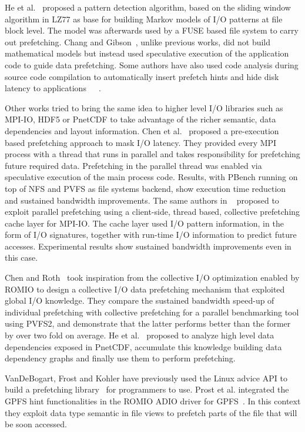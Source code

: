 He et al.~\cite{HeBTAGGMCS13} proposed a pattern detection algorithm, based on the sliding window algorithm in LZ77 as base for building Markov models of I/O patterns at file block level. The model was afterwards used by a FUSE 
based file system to carry out prefetching. Chang and Gibson~\cite{ChangG99}, unlike previous works, did not build mathematical models but instead used speculative execution of the application code to guide data prefetching. Some 
authors have also used code analysis during source code compilation to automatically insert prefetch hints and hide disk latency to applications~\cite{Mowry1996}~\cite{Brown2000}~\cite{Brown2001}.

Other works tried to bring the same idea to higher level I/O libraries such as MPI-IO, HDF5 or PnetCDF to take advantage of the richer semantic, data dependencies and layout information. Chen et al.~\cite{ChenBSTG08} proposed a 
pre-execution based prefetching approach to mask I/O latency. They provided every MPI process with a thread that runs in parallel and takes responsibility for prefetching future required data. Prefetching in the parallel thread 
was enabled via speculative execution of the main process code. Results, with PBench running on top of NFS and PVFS as file systems backend, show execution time reduction and sustained bandwidth improvements. The same authors in
~\cite{Byna2008} proposed to exploit parallel prefetching using a client-side, thread based, collective prefetching cache layer for MPI-IO. The cache layer used I/O pattern information, in the form of I/O signatures, together 
with run-time I/O information to predict future accesses. Experimental results show sustained bandwidth improvements even in this case. 

Chen and Roth~\cite{ChenR10} took inspiration from the collective I/O optimization enabled by ROMIO to design a collective I/O data prefetching mechanism that exploited global I/O knowledge. They compare the sustained bandwidth 
speed-up of individual prefetching with collective prefetching for a parallel benchmarking tool using PVFS2, and demonstrate that the latter performs better than the former by over two fold on average. He et al.~\cite{HEST12} 
proposed to analyze high level data dependencies exposed in PnetCDF, accumulate this knowledge building data dependency graphs and finally use them to perform prefetching.

VanDeBogart, Frost and Kohler have previously used the Linux advice API to build a prefetching library~\cite{VanDeBogartFK09} for programmers to use. Prost et al. integrated the GPFS hint functionalities in the ROMIO ADIO driver 
for GPFS~\cite{ProstTHJK01}. In this context they exploit data type semantic in file views to prefetch parts of the file that will be soon accessed. 

